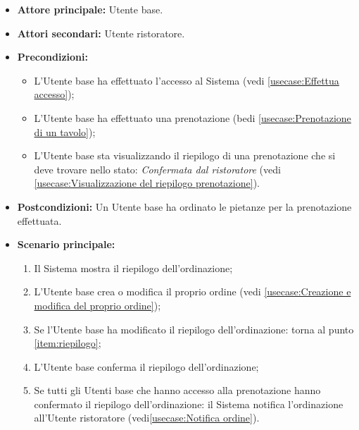 \label{usecase:Ordinazione collaborativa dei pasti}
\begin{itemize}
	\item \textbf{Attore principale:} Utente base.

	\item \textbf{Attori secondari:} Utente ristoratore.

	\item \textbf{Precondizioni:}
		\begin{itemize}
			\item L'Utente base ha effettuato l'accesso al Sistema (vedi \autoref{usecase:Effettua accesso});
			\item L'Utente base ha effettuato una prenotazione (bedi \autoref{usecase:Prenotazione di un tavolo});
			\item L'Utente base sta visualizzando il riepilogo di una prenotazione che si deve trovare nello stato: \textit{Confermata dal ristoratore} (vedi \autoref{usecase:Visualizzazione del riepilogo prenotazione}).
		\end{itemize}
	      
	\item \textbf{Postcondizioni:} Un Utente base ha ordinato le pietanze per la prenotazione effettuata.

	\item \textbf{Scenario principale:}
	      \begin{enumerate}
		      \item \label{item:riepilogo}
		            Il Sistema mostra il riepilogo dell'ordinazione;

		      \item L'Utente base crea o modifica il proprio ordine
		            (vedi \autoref{usecase:Creazione e modifica del proprio ordine});

		      \item Se l'Utente base ha modificato il riepilogo dell'ordinazione: torna al punto \ref{item:riepilogo};

		      \item L'Utente base conferma il riepilogo dell'ordinazione;

		      \item Se tutti gli Utenti base che hanno accesso alla prenotazione
		            hanno confermato il riepilogo dell'ordinazione: il Sistema
		            notifica l'ordinazione all'Utente ristoratore (vedi\autoref{usecase:Notifica ordine}).
	      \end{enumerate}


\end{itemize}
